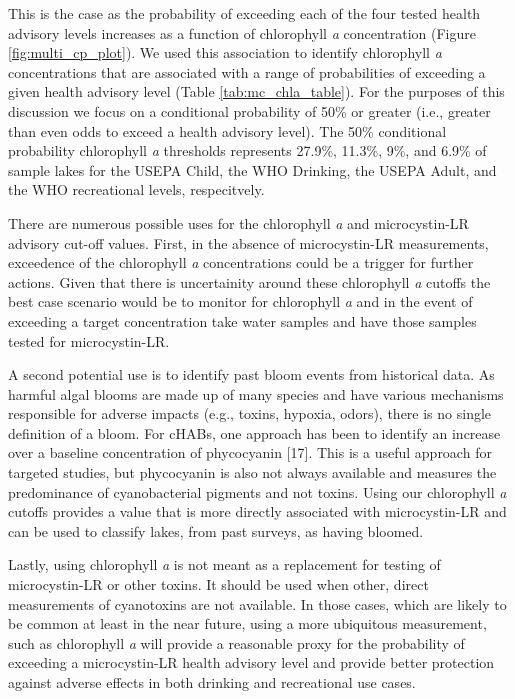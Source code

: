 \documentclass[10pt,a4paper,twocolumn]{article}
\begin{document}
This is the case as the probability of exceeding each of the four tested
health advisory levels increases as a function of chlorophyll \emph{a}
concentration (Figure \ref{fig:multi_cp_plot}). We used this association
to identify chlorophyll \emph{a} concentrations that are associated with
a range of probabilities of exceeding a given health advisory level
(Table \ref{tab:mc_chla_table}). For the purposes of this discussion we
focus on a conditional probability of 50\% or greater (i.e., greater
than even odds to exceed a health advisory level). The 50\% conditional
probability chlorophyll \emph{a} thresholds represents 27.9\%, 11.3\%,
9\%, and 6.9\% of sample lakes for the USEPA Child, the WHO Drinking,
the USEPA Adult, and the WHO recreational levels, respecitvely.

There are numerous possible uses for the chlorophyll \emph{a} and
microcystin-LR advisory cut-off values. First, in the absence of
microcystin-LR measurements, exceedence of the chlorophyll \emph{a}
concentrations could be a trigger for further actions. Given that there
is uncertainity around these chlorophyll \emph{a} cutoffs the best case
scenario would be to monitor for chlorophyll \emph{a} and in the event
of exceeding a target concentration take water samples and have those
samples tested for microcystin-LR.

A second potential use is to identify past bloom events from historical
data. As harmful algal blooms are made up of many species and have
various mechanisms responsible for adverse impacts (e.g., toxins,
hypoxia, odors), there is no single definition of a bloom. For cHABs,
one approach has been to identify an increase over a baseline
concentration of phycocyanin {[}17{]}. This is a useful approach for
targeted studies, but phycocyanin is also not always available and
measures the predominance of cyanobacterial pigments and not toxins.
Using our chlorophyll \emph{a} cutoffs provides a value that is more
directly associated with microcystin-LR and can be used to classify
lakes, from past surveys, as having bloomed.

Lastly, using chlorophyll \emph{a} is not meant as a replacement for
testing of microcystin-LR or other toxins. It should be used when other,
direct measurements of cyanotoxins are not available. In those cases,
which are likely to be common at least in the near future, using a more
ubiquitous measurement, such as chlorophyll \emph{a} will provide a
reasonable proxy for the probability of exceeding a microcystin-LR
health advisory level and provide better protection against adverse
effects in both drinking and recreational use cases.
\end{document}

